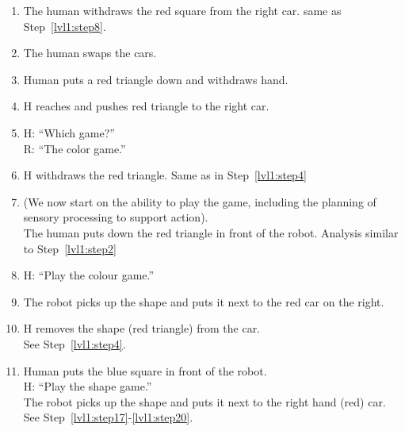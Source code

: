 \documentclass{article}
\begin{document}
\begin{enumerate}
\item \label{lvl1:step11}
  The human withdraws the red square from the right car.
  same as Step~\ref{lvl1:step8}.

\item \label{lvl1:step12}
  The human swaps the cars.

\item \label{lvl1:step13}
  Human puts a red triangle down and withdraws hand.

\item \label{lvl1:step14}
  H reaches and pushes red triangle to the right car.

\item \label{lvl1:step15}
  H: ``Which game?''\\
  R: ``The color game.''

\item \label{lvl1:step16}
  H withdraws the red triangle.
  Same as in Step~\ref{lvl1:step4}

\item \label{lvl1:step17} (We now start on the ability to play the
  game, including the planning of sensory processing to support
  action).\\
  The human puts down the red triangle in front of the robot.
  Analysis similar to Step~\ref{lvl1:step2}

\item \label{lvl1:step18}  
  H: ``Play the colour game.''
  
\item \label{lvl1:step19} 
  The robot picks up the shape and puts it next to the red car on
  the right.

\item \label{lvl1:step20}
  H removes the shape (red triangle) from the car.\\
  See Step~\ref{lvl1:step4}.

\item \label{lvl1:step21}
  Human puts the blue square in front of the robot.\\
  H: ``Play the shape game.''\\
  The robot picks up the shape and puts it next to the right hand
  (red) car.
  See Step~\ref{lvl1:step17}-\ref{lvl1:step20}.
\end{enumerate}

\end{document}
